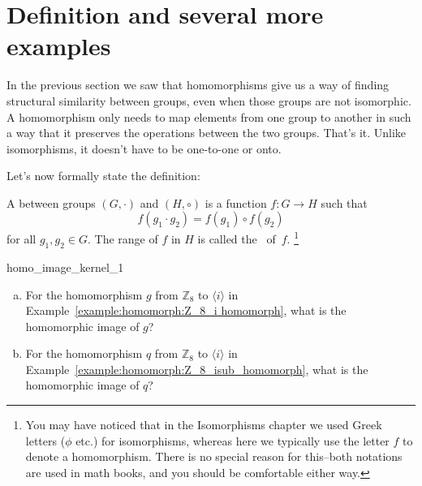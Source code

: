 \section{Definition and several more examples}
\label{sec:Homomorphism:Definitions}

In  the previous section we saw that homomorphisms give us a way of finding structural similarity between groups, even when those groups are not isomorphic.  A homomorphism only needs to  map elements from one group to another in such a way that it preserves the operations between the two groups.  That's it. Unlike isomorphisms, it doesn't have to be one-to-one or onto.  

Let's now formally state the definition:

\begin{defn} \label{homomorphism_def}
A
 between groups $(G, \cdot)$ and $(H, \circ)$ is a function $f :
G \rightarrow H$ such that  
\[
f( g_1 \cdot g_2 ) = f( g_1 ) \circ f( g_2 )
\]
for all $g_1, g_2 \in G$. The range of $f$ in $H$ is called the ~of~$f$.
\footnote{You may have noticed that in the Isomorphisms chapter we used Greek letters ($\phi$ etc.) for isomorphisms, whereas here we typically use the  letter $f$ to denote a homomorphism. There is no special reason for this--both notations are used in math books, and you should be comfortable either way.}
 \end{defn}

\begin{exercise}{homo_image_kernel_1}

\begin{enumerate}[(a)]
\item
For the homomorphism $g$ from ${\mathbb Z}_8$ to $\langle i \rangle$ in Example~\ref{example:homomorph:Z_8_i homomorph}, what is the homomorphic image of $g$?
\item
For the homomorphism $q$ from ${\mathbb Z}_8$ to $\langle i \rangle$ in Example~\ref{example:homomorph:Z_8_isub_homomorph}, what is the homomorphic image of $q$?
\end{enumerate}
\end{exercise}  
 
 
